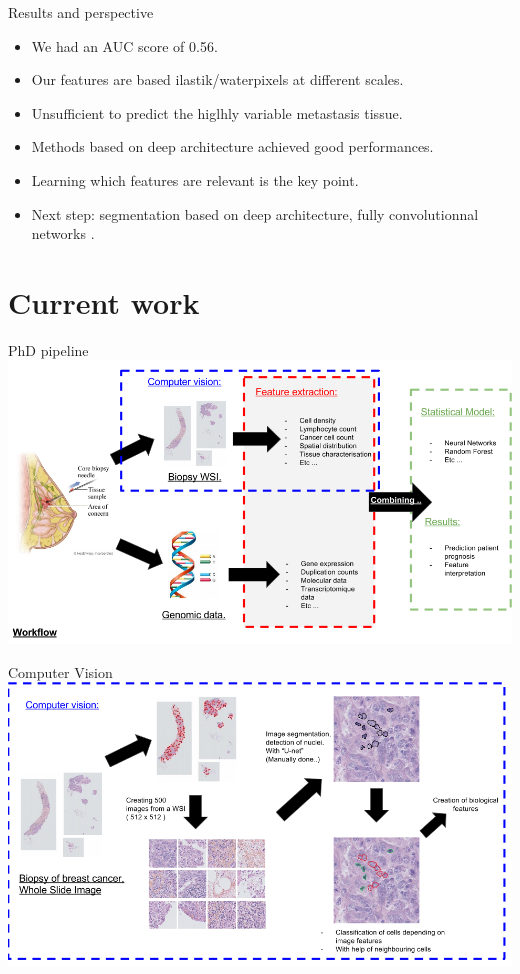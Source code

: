 \documentclass{beamer}
\begin{document}
\begin{frame}{Results and perspective}
\begin{itemize}
\item We had an AUC score of 0.56.
\item Our features are based ilastik/waterpixels at different scales.
\item Unsufficient to predict the higlhly variable metastasis tissue.
\item Methods based on deep architecture achieved good performances.
\item Learning which features are relevant is the key point.
\item Next step: segmentation based on deep architecture, fully convolutionnal networks \cite{FCN}.
\end{itemize}
\end{frame}


\section{Current work}
\begin{frame}{PhD pipeline}
\includegraphics[width=\textwidth]{Workflow_overview.png}
\end{frame}
\begin{frame}{Computer Vision}
\includegraphics[width=\textwidth]{ComputerVision.png}
\end{frame}
\end{document}
